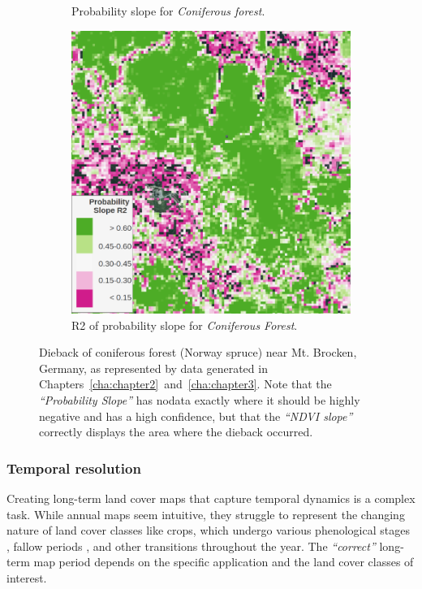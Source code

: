 \begin{figure}[H]
\begin{subfigure}[t]{0.24\textwidth}
        \caption{Probability slope for \textit{Coniferous forest}.}
        \label{fig:brocken_pslope}
        \end{subfigure}
        \hfill
        \begin{subfigure}[t]{0.24\textwidth}
        \centering
        \includegraphics[width=\linewidth,height=\linewidth]{figs_06/brocken_pslope_r2_withlegend.png}
        \caption{R2 of probability slope for \textit{Coniferous Forest}.}
        \label{fig:brocken_pslope_r2}
        \end{subfigure}
        \caption{Dieback of coniferous forest (Norway spruce) near Mt. Brocken, Germany, as represented by data generated in Chapters\@~\ref{cha:chapter2}\@~and\@~\ref{cha:chapter3}. Note that the \textit{``Probability Slope''} has nodata exactly where it should be highly negative and has a high confidence, but that the \textit{``NDVI slope''} correctly displays the area where the dieback occurred.}
        \label{fig:brocken_slope_analysis}
        \end{figure}

        \subsubsection{Temporal resolution}

        Creating long-term land cover maps that capture temporal dynamics is a complex task. While annual maps seem intuitive, they struggle to represent the changing nature of land cover classes like crops, which undergo various phenological stages \citep{russwurm2023end}, fallow periods \citep{tong2020forgotten}, and other transitions \citep{rodriguez2024classification} throughout the year. The \textit{``correct''} long-term map period depends on the specific application and the land cover classes of interest. 
        
